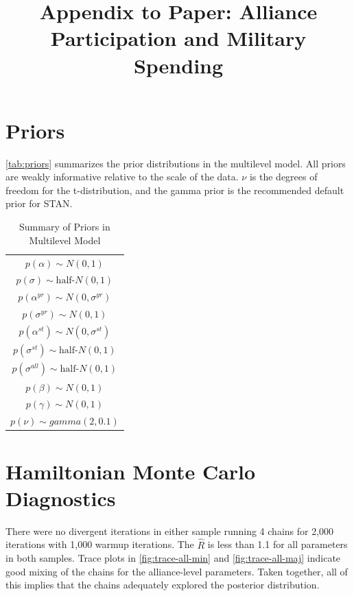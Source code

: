\documentclass[12pt]{article}
\title{\textbf{Appendix to Paper: Alliance Participation and Military Spending}}
\date{}
\begin{document}
\maketitle 

\doublespace 



\section{Priors}

\autoref{tab:priors} summarizes the prior distributions in the multilevel model. 
All priors are weakly informative relative to the scale of the data. 
$\nu$ is the degrees of freedom for the t-distribution, and the gamma prior is the recommended default prior for STAN. 

\begin{table} %
\begin{center}
\begin{tabular}{c} 
$ p(\alpha) \sim N(0, 1)$  \\
$ p(\sigma) \sim \mbox{half-}N(0, 1) $ \\
$ p(\alpha^{yr}) \sim N(0, \sigma^{yr}) $ \\ 
$ p(\sigma^{yr}) \sim N(0, 1) $ \\
$ p(\alpha^{st}) \sim N(0, \sigma^{st}) $ \\ 
$ p(\sigma^{st}) \sim \mbox{half-}N(0, 1) $ \\ 
$ p(\sigma^{all}) \sim \mbox{half-}N(0, 1) $ \\
$ p(\beta) \sim N(0, 1) $ \\
$ p(\gamma) \sim N(0, 1) $ \\ 
$ p(\nu) \sim gamma(2, 0.1)$ 
\end{tabular} 
\caption{Summary of Priors in Multilevel Model} 
\label{tab:priors}
\end{center} 
\end{table} 


\section{Hamiltonian Monte Carlo Diagnostics}

There were no divergent iterations in either sample running 4 chains for 2,000 iterations with 1,000 warmup iterations. 
The $\hat{R}$ is less than 1.1 for all parameters in both samples. 
Trace plots in \autoref{fig:trace-all-min} and \autoref{fig:trace-all-maj} indicate good mixing of the chains for the alliance-level parameters. 
Taken together, all of this implies that the chains adequately explored the posterior distribution. 
\end{document}
